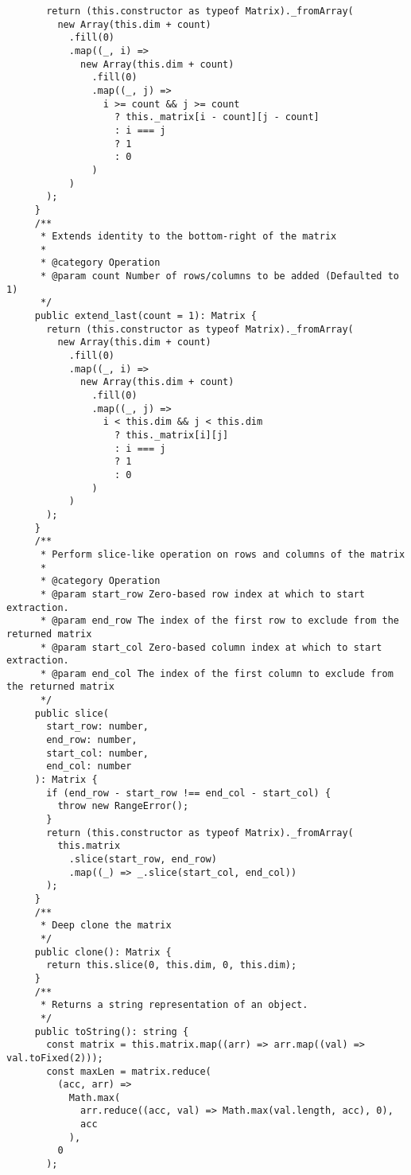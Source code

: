 \documentclass[../main.tex]{subfiles}
\begin{document}
\begin{verbatim}
       return (this.constructor as typeof Matrix)._fromArray(
         new Array(this.dim + count)
           .fill(0)
           .map((_, i) =>
             new Array(this.dim + count)
               .fill(0)
               .map((_, j) =>
                 i >= count && j >= count
                   ? this._matrix[i - count][j - count]
                   : i === j
                   ? 1
                   : 0
               )
           )
       );
     }
     /**
      * Extends identity to the bottom-right of the matrix
      *
      * @category Operation
      * @param count Number of rows/columns to be added (Defaulted to 1)
      */
     public extend_last(count = 1): Matrix {
       return (this.constructor as typeof Matrix)._fromArray(
         new Array(this.dim + count)
           .fill(0)
           .map((_, i) =>
             new Array(this.dim + count)
               .fill(0)
               .map((_, j) =>
                 i < this.dim && j < this.dim
                   ? this._matrix[i][j]
                   : i === j
                   ? 1
                   : 0
               )
           )
       );
     }
     /**
      * Perform slice-like operation on rows and columns of the matrix
      *
      * @category Operation
      * @param start_row Zero-based row index at which to start extraction.
      * @param end_row The index of the first row to exclude from the returned matrix
      * @param start_col Zero-based column index at which to start extraction.
      * @param end_col The index of the first column to exclude from the returned matrix
      */
     public slice(
       start_row: number,
       end_row: number,
       start_col: number,
       end_col: number
     ): Matrix {
       if (end_row - start_row !== end_col - start_col) {
         throw new RangeError();
       }
       return (this.constructor as typeof Matrix)._fromArray(
         this.matrix
           .slice(start_row, end_row)
           .map((_) => _.slice(start_col, end_col))
       );
     }
     /**
      * Deep clone the matrix
      */
     public clone(): Matrix {
       return this.slice(0, this.dim, 0, this.dim);
     }
     /**
      * Returns a string representation of an object.
      */
     public toString(): string {
       const matrix = this.matrix.map((arr) => arr.map((val) => val.toFixed(2)));
       const maxLen = matrix.reduce(
         (acc, arr) =>
           Math.max(
             arr.reduce((acc, val) => Math.max(val.length, acc), 0),
             acc
           ),
         0
       );
   

\end{verbatim}
\end{document}
